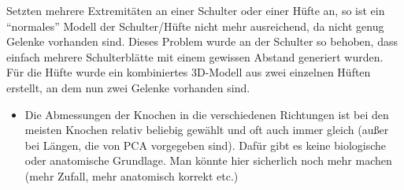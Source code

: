 
Setzten mehrere Extremitäten an einer Schulter oder einer Hüfte an, so ist ein "`normales"' Modell der Schulter/Hüfte nicht mehr ausreichend, da nicht genug Gelenke vorhanden sind. Dieses Problem wurde an der Schulter so behoben, dass einfach mehrere Schulterblätte mit einem gewissen Abstand generiert wurden. Für die Hüfte wurde ein kombiniertes 3D-Modell aus zwei einzelnen Hüften erstellt, an dem nun zwei Gelenke vorhanden sind.


\begin{itemize}
 \item Die Abmessungen der Knochen in die verschiedenen Richtungen ist bei den meisten Knochen relativ beliebig gewählt und oft auch immer gleich (außer bei Längen, die von PCA vorgegeben sind). Dafür gibt es keine biologische oder anatomische Grundlage. Man könnte hier sicherlich noch mehr machen (mehr Zufall, mehr anatomisch korrekt etc.)
\end{itemize}




